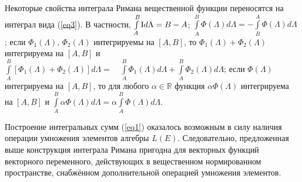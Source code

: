Некоторые свойства интеграла Римана вещественной функции переносятся на
интеграл вида (\ref{eq3}). В частности, ${\int\limits_{A}^{B} {{\rm I}d\Lambda}}   =
B - A$; ${\int\limits_{A}^{B} {\Phi (\Lambda )d\Lambda}}   = -
{\int\limits_{B}^{A} {\Phi (\Lambda )d\Lambda}}  $; если $\Phi _{1} (\Lambda
)$, $\Phi _{2} (\Lambda )$ интегрируемы на ${\left[ {A,B} \right]}$, то
$\Phi _{1} (\Lambda ) + \Phi _{2} (\Lambda )$ интегрируема на ${\left[ {A,B}
\right]}$ и ${\int\limits_{A}^{B} {{\left[ {\Phi _{1} (\Lambda ) + \Phi _{2}
(\Lambda )} \right]}d\Lambda}}   =  \quad {\int\limits_{A}^{B} {\Phi _{1}
(\Lambda )d\Lambda}}   + {\int\limits_{A}^{B} {\Phi _{2} (\Lambda )d\Lambda
}} $; если $\Phi (\Lambda )$ интегрируема на ${\left[ {A,B} \right]}$, то
для любого $\alpha \in \mathbb{R}$  функция $\alpha \Phi (\Lambda )$ интегрируема на
${\left[ {A,B} \right]}$ и ${\int\limits_{A}^{B} {\alpha \Phi (\Lambda
)d\Lambda}}   = \alpha {\int\limits_{A}^{B} {\Phi (\Lambda )d\Lambda}}  $.

Построение интегральных сумм (\ref{eq1}) оказалось возможным в силу наличия операции
умножения элементов алгебры $L(E)$. Следовательно, предложенная выше
конструкция интеграла Римана пригодна для векторных функций векторного
переменного, действующих в вещественном нормированном пространстве,
снабжённом дополнительной операцией умножения элементов.
